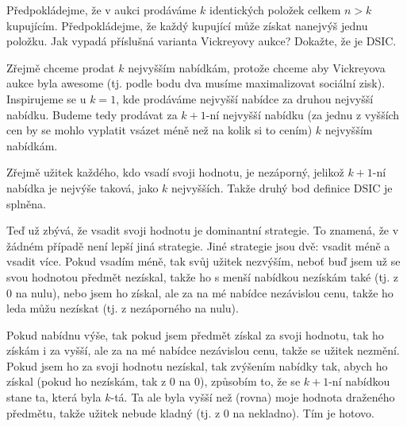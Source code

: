 \documentclass[12pt]{article}					%
\begin{document}
\begin{priklad}[4.2]
	Předpokládejme, že v aukci prodáváme $k$ identických položek celkem $n > k$ kupujícím. Předpokládejme, že každý kupující může získat nanejvýš jednu položku. Jak vypadá příslušná varianta Vickreyovy aukce? Dokažte, že je DSIC.

	\begin{reseni}
		Zřejmě chceme prodat $k$ nejvyšším nabídkám, protože chceme aby Vickreyova aukce byla awesome (tj. podle bodu dva musíme maximalizovat sociální zisk). Inspirujeme se u $k = 1$, kde prodáváme nejvyšší nabídce za druhou nejvyšší nabídku. Budeme tedy prodávat za $k+1$-ní nejvyšší nabídku (za jednu z vyšších cen by se mohlo vyplatit vsázet méně než na kolik si to cením) $k$ nejvyšším nabídkám.

		Zřejmě užitek každého, kdo vsadí svoji hodnotu, je nezáporný, jelikož $k+1$-ní nabídka je nejvýše taková, jako $k$ nejvyšších. Takže druhý bod definice DSIC je splněna.

		Teď už zbývá, že vsadit svoji hodnotu je dominantní strategie. To znamená, že v žádném případě není lepší jiná strategie. Jiné strategie jsou dvě: vsadit méně a vsadit více. Pokud vsadím méně, tak svůj užitek nezvýším, neboť buď jsem už se svou hodnotou předmět nezískal, takže ho s menší nabídkou nezískám také (tj. z 0 na nulu), nebo jsem ho získal, ale za na mé nabídce nezávislou cenu, takže ho leda můžu nezískat (tj. z nezáporného na nulu).

		Pokud nabídnu výše, tak pokud jsem předmět získal za svoji hodnotu, tak ho získám i za vyšší, ale za na mé nabídce nezávislou cenu, takže se užitek nezmění. Pokud jsem ho za svoji hodnotu nezískal, tak zvýšením nabídky tak, abych ho získal (pokud ho nezískám, tak z 0 na 0), způsobím to, že se $k+1$-ní nabídkou stane ta, která byla $k$-tá. Ta ale byla vyšší než (rovna) moje hodnota draženého předmětu, takže užitek nebude kladný (tj. z 0 na nekladno). Tím je hotovo.
	\end{reseni}
\end{priklad}
\end{document}
